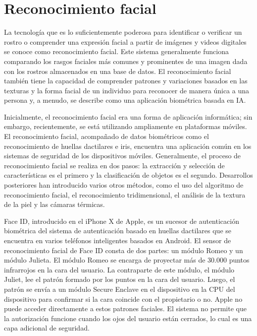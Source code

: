 \section{Reconocimiento facial}

La tecnología que es lo suficientemente poderosa para identificar o verificar un rostro o comprender una expresión facial a partir de imágenes y videos digitales se conoce como reconocimiento facial. Este sistema generalmente funciona comparando los rasgos faciales más comunes y prominentes de una imagen dada con los rostros almacenados en una base de datos. El reconocimiento facial también tiene la capacidad de comprender patrones y variaciones basados en las texturas y la forma facial de un individuo para reconocer de manera única a una persona y, a menudo, se describe como una aplicación biométrica basada en IA.

Inicialmente, el reconocimiento facial era una forma de aplicación informática; sin embargo, recientemente, se está utilizando ampliamente en plataformas móviles. El reconocimiento facial, acompañado de datos biométricos como el reconocimiento de huellas dactilares e iris, encuentra una aplicación común en los sistemas de seguridad de los dispositivos móviles. Generalmente, el proceso de reconocimiento facial se realiza en dos pasos: la extracción y selección de características es el primero y la clasificación de objetos es el segundo. Desarrollos posteriores han introducido varios otros métodos, como el uso del algoritmo de reconocimiento facial, el reconocimiento tridimensional, el análisis de la textura de la piel y las cámaras térmicas.

Face ID, introducido en el iPhone X de Apple, es un sucesor de autenticación biométrica del sistema de autenticación basado en huellas dactilares que se encuentra en varios teléfonos inteligentes basados en Android. El sensor de reconocimiento facial de Face ID consta de dos partes: un módulo Romeo y un módulo Julieta. El módulo Romeo se encarga de proyectar más de 30.000 puntos infrarrojos en la cara del usuario. La contraparte de este módulo, el módulo Juliet, lee el patrón formado por los puntos en la cara del usuario. Luego, el patrón se envía a un módulo Secure Enclave en el dispositivo en la CPU del dispositivo para confirmar si la cara coincide con el propietario o no. Apple no puede acceder directamente a estos patrones faciales. El sistema no permite que la autorización funcione cuando los ojos del usuario están cerrados, lo cual es una capa adicional de seguridad.

